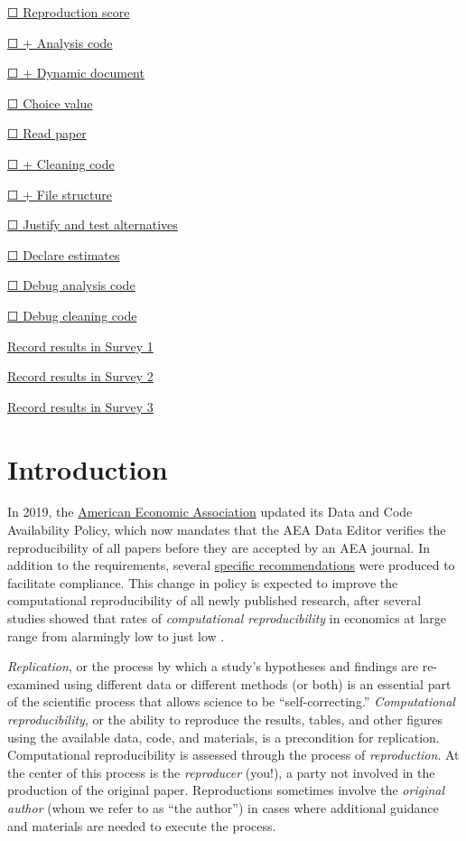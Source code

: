 \documentclass[]{book}
\begin{document}
\protect\hyperlink{score}{☐ Reproduction score}

\protect\hyperlink{ac}{☐ + Analysis code}

\protect\hyperlink{paper-level}{☐ + Dynamic document}

\protect\hyperlink{id-val}{☐ Choice value}

\protect\hyperlink{read-summ}{☐ Read paper}

\protect\hyperlink{cc}{☐ + Cleaning code}

\protect\hyperlink{paper-level}{☐ + File structure}

\protect\hyperlink{test-rob}{☐ Justify and test alternatives}

\protect\hyperlink{declare-estimates}{☐ Declare estimates}

\protect\hyperlink{dac}{☐ Debug analysis code}

\protect\hyperlink{dcc}{☐ Debug cleaning code}

\href{https://berkeley.qualtrics.com/jfe/form/SV_3UWe5xu3qjeh0c5}{Record results in Survey 1}

\href{https://berkeley.qualtrics.com/jfe/form/SV_2gd9Y3XVtjLpZL7}{Record results in Survey 2}

\href{ADD\%20LINK}{Record results in Survey 3}

\hypertarget{intro}{%
\chapter*{Introduction}\label{intro}}

In 2019, the \href{https://www.aeaweb.org/journals/policies/data-code/}{American Economic Association} updated its Data and Code Availability Policy, which now mandates that the AEA Data Editor verifies the reproducibility of all papers before they are accepted by an AEA journal. In addition to the requirements, several \href{https://aeadataeditor.github.io/aea-de-guidance/}{specific recommendations} were produced to facilitate compliance. This change in policy is expected to improve the computational reproducibility of all newly published research, after several studies showed that rates of \emph{computational reproducibility} in economics at large range from alarmingly low \citep{galiani2018make, chang2015economics} to just low \citep{kingi2018reproducibility}.

\emph{Replication}, or the process by which a study's hypotheses and findings are re-examined using different data or different methods (or both) \citep{King95} is an essential part of the scientific process that allows science to be ``self-correcting.'' \emph{Computational reproducibility}, or the ability to reproduce the results, tables, and other figures using the available data, code, and materials, is a precondition for replication. Computational reproducibility is assessed through the process of \emph{reproduction}. At the center of this process is the \emph{reproducer} (you!), a party not involved in the production of the original paper. Reproductions sometimes involve the \emph{original author} (whom we refer to as ``the author'') in cases where additional guidance and materials are needed to execute the process.
\end{document}
